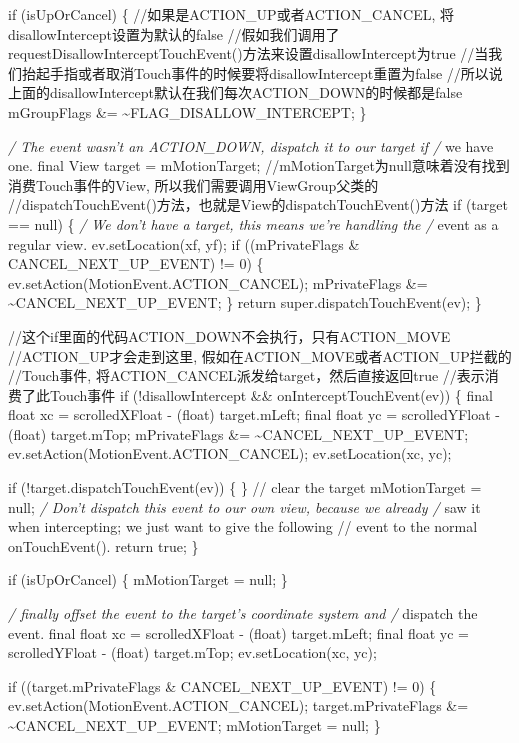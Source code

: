 \documentclass[9pt, b5paper]{article}
\begin{document}
if (isUpOrCancel) \{  
    //如果是ACTION\_UP或者ACTION\_CANCEL, 将disallowIntercept设置为默认的false  
 //假如我们调用了requestDisallowInterceptTouchEvent()方法来设置disallowIntercept为true  
 //当我们抬起手指或者取消Touch事件的时候要将disallowIntercept重置为false  
 //所以说上面的disallowIntercept默认在我们每次ACTION\_DOWN的时候都是false  
    mGroupFlags \&= \textasciitilde{}FLAG\_DISALLOW\_INTERCEPT;  
\}  

\emph{/ The event wasn't an ACTION\_DOWN, dispatch it to our target if  
/} we have one.  
final View target = mMotionTarget;  
//mMotionTarget为null意味着没有找到消费Touch事件的View, 所以我们需要调用ViewGroup父类的  
//dispatchTouchEvent()方法，也就是View的dispatchTouchEvent()方法  
if (target == null) \{  
    \emph{/ We don't have a target, this means we're handling the  
    /} event as a regular view.  
    ev.setLocation(xf, yf);  
    if ((mPrivateFlags \& CANCEL\_NEXT\_UP\_EVENT) != 0) \{  
        ev.setAction(MotionEvent.ACTION\_CANCEL);  
        mPrivateFlags \&= \textasciitilde{}CANCEL\_NEXT\_UP\_EVENT;  
    \}  
    return super.dispatchTouchEvent(ev);  
\}  

//这个if里面的代码ACTION\_DOWN不会执行，只有ACTION\_MOVE  
//ACTION\_UP才会走到这里, 假如在ACTION\_MOVE或者ACTION\_UP拦截的  
//Touch事件, 将ACTION\_CANCEL派发给target，然后直接返回true  
//表示消费了此Touch事件  
if (!disallowIntercept \&\& onInterceptTouchEvent(ev)) \{  
    final float xc = scrolledXFloat - (float) target.mLeft;  
    final float yc = scrolledYFloat - (float) target.mTop;  
    mPrivateFlags \&= \textasciitilde{}CANCEL\_NEXT\_UP\_EVENT;  
    ev.setAction(MotionEvent.ACTION\_CANCEL);  
    ev.setLocation(xc, yc);  

    if (!target.dispatchTouchEvent(ev)) \{  
    \}  
    // clear the target  
    mMotionTarget = null;  
    \emph{/ Don't dispatch this event to our own view, because we already  
    /} saw it when intercepting; we just want to give the following  
    // event to the normal onTouchEvent().  
    return true;  
\}  

if (isUpOrCancel) \{  
    mMotionTarget = null;  
\}  

\emph{/ finally offset the event to the target's coordinate system and  
/} dispatch the event.  
final float xc = scrolledXFloat - (float) target.mLeft;  
final float yc = scrolledYFloat - (float) target.mTop;  
ev.setLocation(xc, yc);  

if ((target.mPrivateFlags \& CANCEL\_NEXT\_UP\_EVENT) != 0) \{  
    ev.setAction(MotionEvent.ACTION\_CANCEL);  
    target.mPrivateFlags \&= \textasciitilde{}CANCEL\_NEXT\_UP\_EVENT;  
    mMotionTarget = null;  
\}  
\end{document}
